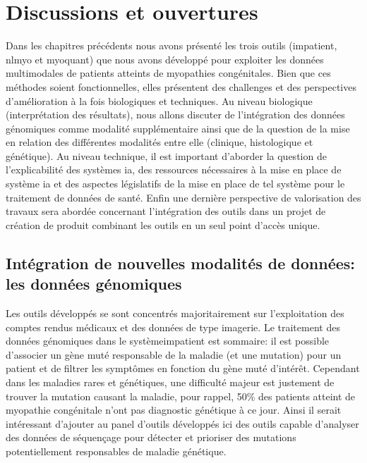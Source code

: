 \chapter{Discussions et ouvertures}
Dans les chapitres précédents nous avons présenté les trois outils (\gls{impatient}, \gls{nlmyo} et \gls{myoquant}) que nous avons développé pour exploiter les données multimodales de patients atteints de myopathies congénitales. Bien que ces méthodes soient fonctionnelles, elles présentent des challenges et des perspectives d'amélioration à la fois biologiques et techniques. Au niveau biologique (interprétation des résultats), nous allons discuter de l'intégration des données génomiques comme modalité supplémentaire ainsi que de la question de la mise en relation des différentes modalités entre elle (clinique, histologique et génétique). Au niveau technique, il est important d'aborder la question de l'explicabilité des systèmes \gls{ia}, des ressources nécessaires à la mise en place de système \gls{ia} et des aspectes législatifs de la mise en place de tel système pour le traitement de données de santé. Enfin une dernière perspective de valorisation des travaux sera abordée concernant l'intégration des outils dans un projet de création de produit combinant les outils en un seul point d'accès unique.

\section{Intégration de nouvelles modalités de données: les données génomiques}
Les outils développés se sont concentrés majoritairement sur l'exploitation des comptes rendus médicaux et des données de type imagerie. Le traitement des données génomiques dans le système\gls{impatient} est sommaire: il est possible d'associer un gène muté responsable de la maladie (et une mutation) pour un patient et de filtrer les symptômes en fonction du gène muté d'intérêt. Cependant dans les maladies rares et génétiques, une difficulté majeur est justement de trouver la mutation causant la maladie, pour rappel, 50\% des patients atteint de myopathie congénitale n'ont pas diagnostic génétique à ce jour. Ainsi il serait intéressant d'ajouter au panel d'outils développés ici des outils capable d'analyser des données de séquençage pour détecter et prioriser des mutations potentiellement responsables de maladie génétique. 

